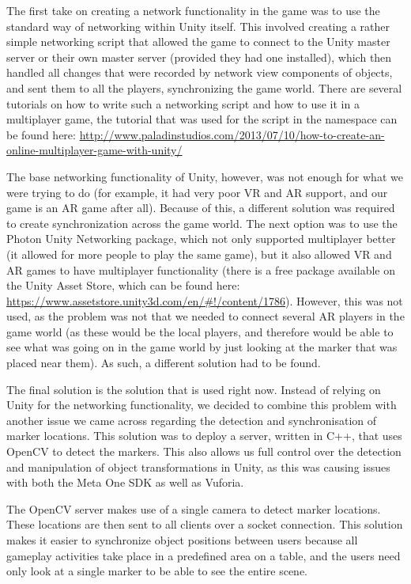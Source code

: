 			The first take on creating a network functionality in the game
			was to use the standard way of networking within Unity itself.
			This involved creating a rather simple networking script that
			allowed the game to connect to the Unity master server or their own
			master server (provided they had one installed), which then handled
			all changes that were recorded by network view components of objects,
			and sent them to all the players, synchronizing the game world.
			There are several tutorials on how to write such a networking
			script and how to use it in a multiplayer game, the tutorial that
			was used for the script in the namespace can be found here:
			\url{http://www.paladinstudios.com/2013/07/10/how-to-create-an-online-multiplayer-game-with-unity/}
			
			The base networking functionality of Unity, however, was not enough
			for what we were trying to do (for example, it had very poor VR and
			AR support, and our game is an AR game after all). Because of this,
			a different solution was required to create synchronization across
			the game world. The next option was to use the Photon Unity Networking
			package, which not only supported multiplayer better (it allowed for
			more people to play the same game), but it also allowed VR and AR games
			to have multiplayer functionality (there is a free package available
			on the Unity Asset Store, which can be found here: \url{https://www.assetstore.unity3d.com/en/#!/content/1786}). However,
			this was not used, as the problem was not that we needed to connect
			several AR players in the game world (as these would be the local players,
			and therefore would be able to see what was going on in the game world
			by just looking at the marker that was placed near them). As such,
			a different solution had to be found.
			
			The final solution is the solution that is used right now. Instead of 
			relying on Unity for the networking functionality, we decided to 
			combine this problem with another issue we came across regarding 
			the detection and synchronisation of marker locations. This solution
			was to deploy a server, written in C++, that uses OpenCV to detect 
			the markers. This also allows us full control over the detection and 
			manipulation of object transformations in Unity, as this was causing 
			issues with both the Meta One SDK as well as Vuforia.
			
			The OpenCV server makes use of a single camera to detect marker locations.
			These locations are then sent to all clients over a socket connection.
			This solution makes it easier to synchronize object positions between users
			because all gameplay activities take place in a predefined area on a table,
			and the users need only look at a single marker to be able to see the 
			entire scene. 
			
